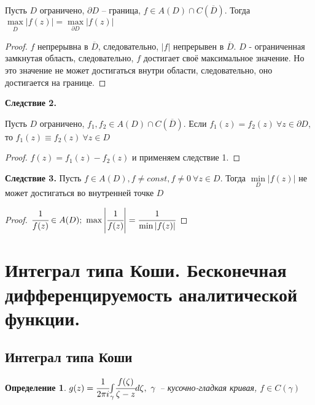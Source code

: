 \documentclass[draft]{report}
\newcommand{\dd}{\partial}
\newcommand{\mint}[2]{\underset{#1}{\overset{#2}{\int}}}
\newcommand{\mmax}[1]{\underset{#1}{\max}}
\newcommand{\mmin}[1]{\underset{#1}{\min}}
\renewcommand{\bar}{\overline}
\newcommand{\g}{\gamma}
\newcommand{\F}{\ \forall}
\newcommand{\opr}[1]{\begin{opred}#1\end{opred}}
\newtheorem*{opred}{Определение}
\theoremstyle{remark}
\begin{document}
Пусть $D$ ограничено, $\dd D$ -- граница, $f\in A(D)\cap C(\bar{D})$. Тогда $\mmax{\bar{D}}|f(z)|=\mmax{\dd D}|f(z)|$
\begin{proof}
$f$ непрерывна в $\bar{D}$, следовательно, $|f|$ непрерывен в $\bar{D}$. $D$ - ограниченная замкнутая область, следовательно, $f$ достигает своё максимальное значение. Но это значение не может достигаться внутри области, следовательно, оно достигается на границе.
\end{proof}
{\bfseries Следствие 2.}

Пусть $D$ ограничено, $f_1,f_2\in A(D)\cap C(\bar{D})$. Если $f_1(z)=f_2(z)\F z\in\dd D$, то $f_1(z)\equiv f_2(z)\F z\in D$
\begin{proof}
$f(z)=f_1(z)-f_2(z)$ и применяем следствие 1.
\end{proof}
{\bfseries Следствие 3.}
Пусть $f\in  A(D),f\neq const,f\neq 0\F z\in D$. Тогда $\mmin{D}|f(z)|$ не может достигаться во внутренней точке $D$
\begin{proof}
$\cfrac{1}{f(z)}\in A(D);\ \max\left|\cfrac{1}{f(z)}\right|=\cfrac{1}{\min|f(z)|}$
\end{proof}

\section{Интеграл типа Коши. Бесконечная дифференцируемость аналитической функции.}

\subsection{Интеграл типа Коши}

\opr{$g(z)=\cfrac 1{2\pi i}\mint{\g}{}\cfrac{f(\zeta)}{\zeta-z}d\zeta,\ \g$ -- кусочно-гладкая кривая, $f\in C(\g)$}
\end{document}
